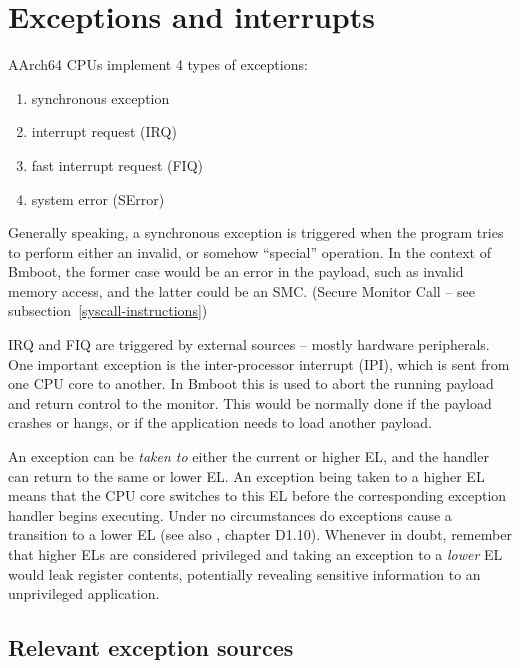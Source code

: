 \newcommand{\ELRELn}{\texttt{ELR\_EL\textit{n}}}
\newcommand{\SPSRELn}{\texttt{SPSR\_EL\textit{n}}}

\section{Exceptions and interrupts}

AArch64 CPUs implement 4 types of exceptions:

\begin{enumerate}
  \item synchronous exception
  \item interrupt request (IRQ)
  \item fast interrupt request (FIQ)
  \item system error (SError)
\end{enumerate}

Generally speaking, a synchronous exception is triggered when the program tries to perform either an invalid,
or somehow ``special'' operation.
In the context of Bmboot, the former case would be an error in the payload, such as invalid memory access,
and the latter could be an SMC. (Secure Monitor Call -- see subsection~\ref{syscall-instructions})

IRQ and FIQ are triggered by external sources -- mostly hardware peripherals.
One important exception is the inter-processor interrupt (IPI), which is sent from one CPU core to another.
In Bmboot this is used to abort the running payload and return control to the monitor.
This would be normally done if the payload crashes or hangs, or if the application needs to load another payload.

An exception can be \textit{taken to} either the current or higher EL, and the handler can return to the same or lower EL. An exception being taken to a higher EL means that the CPU core switches to this EL before the corresponding exception handler begins executing. Under no circumstances do exceptions cause a transition to a lower EL (see also \cite{arm-arm}, chapter D1.10). Whenever in doubt, remember that higher ELs are considered privileged and taking an exception to a \textit{lower} EL would leak register contents, potentially revealing sensitive information to an unprivileged application.

\subsection{Relevant exception sources}

